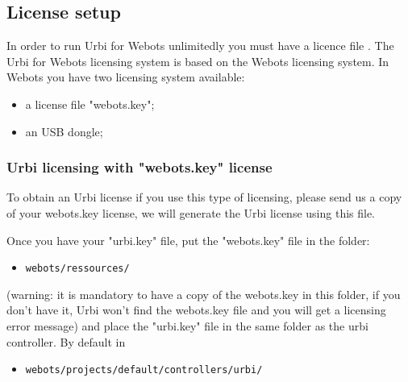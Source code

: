 

\subsection{License setup}
\label{webots.license}%

In order to run Urbi for Webots unlimitedly you must have a licence
file .  The Urbi for Webots licensing system is based on the Webots
licensing system.  In Webots you have two licensing system available:
\begin{itemize}
\item a license file "webots.key";
\item an USB dongle;
\end{itemize}


\subsubsection{Urbi licensing with "webots.key" license}
\label{webots.license.webotskey}%

To obtain an Urbi license if you use this type of licensing, please
send us a copy of your webots.key license, we will generate the Urbi
license using this file.


Once you have your "urbi.key" file, put the "webots.key" file in the
folder:
\begin{itemize}

\item \nolinkurl{webots/ressources/}

\end{itemize}
(warning: it is mandatory to have a copy of the webots.key in this
folder, if you don't have it, Urbi won't find the webots.key file and
you will get a licensing error message) and place the "urbi.key" file
in the same folder as the urbi controller. By default in
\begin{itemize}

\item \nolinkurl{webots/projects/default/controllers/urbi/}

\end{itemize}


